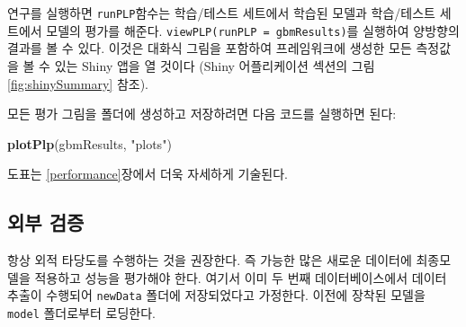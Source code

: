 \documentclass[10.5pt]{book}
\newenvironment{Shaded}{\begin{snugshade}}{\end{snugshade}}
\newcommand{\KeywordTok}[1]{\textcolor[rgb]{0.13,0.29,0.53}{\textbf{#1}}}
\newcommand{\StringTok}[1]{\textcolor[rgb]{0.31,0.60,0.02}{#1}}
\newcommand{\NormalTok}[1]{#1}
\theoremstyle{definition}
\theoremstyle{definition}
\theoremstyle{definition}
\theoremstyle{remark}
\begin{document}
연구를 실행하면 \texttt{runPLP}함수는 학습/테스트 세트에서 학습된 모델과
학습/테스트 세트에서 모델의 평가를 해준다.
\texttt{viewPLP(runPLP\ =\ gbmResults)}를 실행하여 양방향의 결과를 볼 수
있다. 이것은 대화식 그림을 포함하여 프레임워크에 생성한 모든 측정값을 볼
수 있는 Shiny 앱을 열 것이다 (Shiny 어플리케이션 섹션의 그림
\ref{fig:shinySummary} 참조).

모든 평가 그림을 폴더에 생성하고 저장하려면 다음 코드를 실행하면 된다:

\begin{Shaded}
\begin{Highlighting}[]
\KeywordTok{plotPlp}\NormalTok{(gbmResults, }\StringTok{"plots"}\NormalTok{)}
\end{Highlighting}
\end{Shaded}

도표는 \ref{performance}장에서 더욱 자세하게 기술된다.

\subsection{외부 검증}\label{-}

항상 외적 타당도를 수행하는 것을 권장한다. 즉 가능한 많은 새로운
데이터에 최종모델을 적용하고 성능을 평가해야 한다. 여기서 이미 두 번째
데이터베이스에서 데이터 추출이 수행되어 \texttt{newData} 폴더에
저장되었다고 가정한다. 이전에 장착된 모델을 \texttt{model} 폴더로부터
로딩한다.
\end{document}
